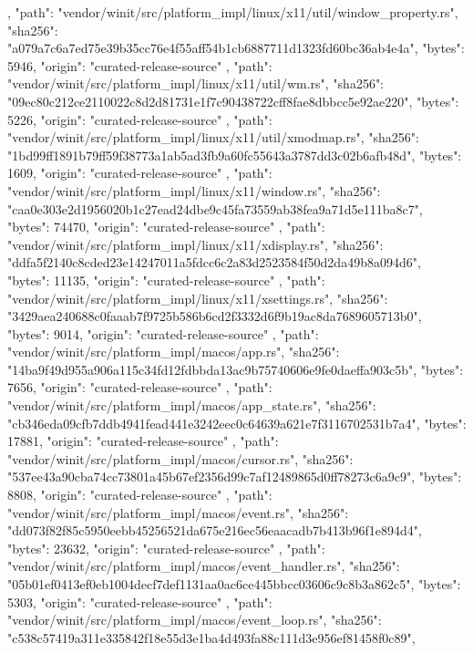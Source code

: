{{    },
    {
      "path": "vendor/winit/src/platform_impl/linux/x11/util/window_property.rs",
      "sha256": "a079a7c6a7ed75e39b35cc76e4f55aff54b1cb6887711d1323fd60bc36ab4e4a",
      "bytes": 5946,
      "origin": "curated-release-source"
    },
    {
      "path": "vendor/winit/src/platform_impl/linux/x11/util/wm.rs",
      "sha256": "09ec80c212ce2110022c8d2d81731e1f7c90438722cff8fae8dbbcc5e92ae220",
      "bytes": 5226,
      "origin": "curated-release-source"
    },
    {
      "path": "vendor/winit/src/platform_impl/linux/x11/util/xmodmap.rs",
      "sha256": "1bd99ff1891b79ff59f38773a1ab5ad3fb9a60fc55643a3787dd3c02b6afb48d",
      "bytes": 1609,
      "origin": "curated-release-source"
    },
    {
      "path": "vendor/winit/src/platform_impl/linux/x11/window.rs",
      "sha256": "caa0e303e2d1956020b1c27ead24dbe9c45fa73559ab38fea9a71d5e111ba8c7",
      "bytes": 74470,
      "origin": "curated-release-source"
    },
    {
      "path": "vendor/winit/src/platform_impl/linux/x11/xdisplay.rs",
      "sha256": "ddfa5f2140c8cded23e14247011a5fdcc6c2a83d2523584f50d2da49b8a094d6",
      "bytes": 11135,
      "origin": "curated-release-source"
    },
    {
      "path": "vendor/winit/src/platform_impl/linux/x11/xsettings.rs",
      "sha256": "3429aea240688c0faaab7f9725b586b6cd2f3332d6f9b19ac8da7689605713b0",
      "bytes": 9014,
      "origin": "curated-release-source"
    },
    {
      "path": "vendor/winit/src/platform_impl/macos/app.rs",
      "sha256": "14ba9f49d955a906a115c34fd12fdbbda13ac9b75740606e9fe0daeffa903c5b",
      "bytes": 7656,
      "origin": "curated-release-source"
    },
    {
      "path": "vendor/winit/src/platform_impl/macos/app_state.rs",
      "sha256": "cb346eda09cfb7ddb4941fead441e3242eec0c64639a621e7f3116702531b7a4",
      "bytes": 17881,
      "origin": "curated-release-source"
    },
    {
      "path": "vendor/winit/src/platform_impl/macos/cursor.rs",
      "sha256": "537ee43a90cba74cc73801a45b67ef2356d99c7af12489865d0ff78273c6a9c9",
      "bytes": 8808,
      "origin": "curated-release-source"
    },
    {
      "path": "vendor/winit/src/platform_impl/macos/event.rs",
      "sha256": "dd073f82f85c5950eebb45256521da675e216ec56eaacadb7b413b96f1e894d4",
      "bytes": 23632,
      "origin": "curated-release-source"
    },
    {
      "path": "vendor/winit/src/platform_impl/macos/event_handler.rs",
      "sha256": "05b01ef0413ef0eb1004decf7def1131aa0ac6ce445bbcc03606c9c8b3a862c5",
      "bytes": 5303,
      "origin": "curated-release-source"
    },
    {
      "path": "vendor/winit/src/platform_impl/macos/event_loop.rs",
      "sha256": "c538c57419a311e335842f18e55d3e1ba4d493fa88c111d3e956ef81458f0c89",
}}
